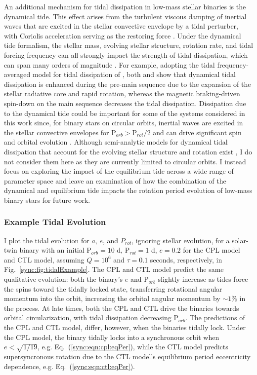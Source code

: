 An additional mechanism for tidal dissipation in low-mass stellar binaries is the dynamical tide. This effect arises from the turbulent viscous damping of inertial waves that are excited in the stellar convective envelope by a tidal perturber, with Coriolis acceleration serving as the restoring force \citep{Zahn1975,Ogilvie2007}. Under the dynamical tide formalism, the stellar mass, evolving stellar structure, rotation rate, and tidal forcing frequency can all strongly impact the strength of tidal dissipation, which can span many orders of magnitude \citep{Ogilvie2007,Ogilvie2013,Mathis2015,Gallet2017}. For example, adopting the tidal frequency-averaged model for tidal dissipation of \citet{Ogilvie2013}, both \citet{Mathis2015} and \citet{Gallet2017} show that dynamical tidal dissipation is enhanced during the pre-main sequence due to the expansion of the stellar radiative core and rapid rotation, whereas the magnetic braking-driven spin-down on the main sequence decreases the tidal dissipation. Dissipation due to the dynamical tide could be important for some of the systems considered in this work since, for binary stars on circular orbits, inertial waves are excited in the stellar convective envelopes for P$_{orb} > $P$_{rot}/2$ and can drive significant spin and orbital evolution \citep[e.g.][]{Witte2002,Ogilvie2007,Bolmont2016}. Although semi-analytic models for dynamical tidal dissipation that account for the evolving stellar structure and rotation exist \citep[e.g.][]{Mathis2015,Bolmont2016,Gallet2017}, I do not consider them here as they are currently limited to circular orbits. I instead focus on exploring the impact of the equilibrium tide across a wide range of parameter space and leave an examination of how the combination of the dynamical and equilibrium tide impacts the rotation period evolution of low-mass binary stars for future work.

\subsubsection{Example Tidal Evolution} \label{sync:sec:methods:eqtideExample}

I plot the tidal evolution for $a$, $e$, and $P_{rot}$, ignoring stellar evolution, for a solar-twin binary with an initial P$_{orb} = 10$ d, P$_{rot} = 1$ d, $e = 0.2$ for the CPL model and CTL model, assuming $Q=10^6$ and $\tau = 0.1$ seconds, respectively, in Fig.~\ref{sync:fig:tidalExample}. The CPL and CTL model predict the same qualitative evolution: both the binary's $e$ and P$_{orb}$ slightly increase as tides force the spins toward the tidally locked state, transferring rotational angular momentum into the orbit, increasing the orbital angular momentum by ${\sim}1\%$ in the process.  At late times, both the CPL and CTL drive the binaries towards orbital circularization, with tidal dissipation decreasing P$_{orb}$. The predictions of the CPL and CTL model, differ, however, when the binaries tidally lock.  Under the CPL model, the binary tidally locks into a synchronous orbit when $e < \sqrt{1/19}$, e.g. Eq.~(\ref{sync:eqn:cpl:eqPer}), while the CTL model predicts supersyncronous rotation due to the CTL model's equilibrium period eccentricity dependence, e.g. Eq.~(\ref{sync:eqn:ctl:eqPer}).

